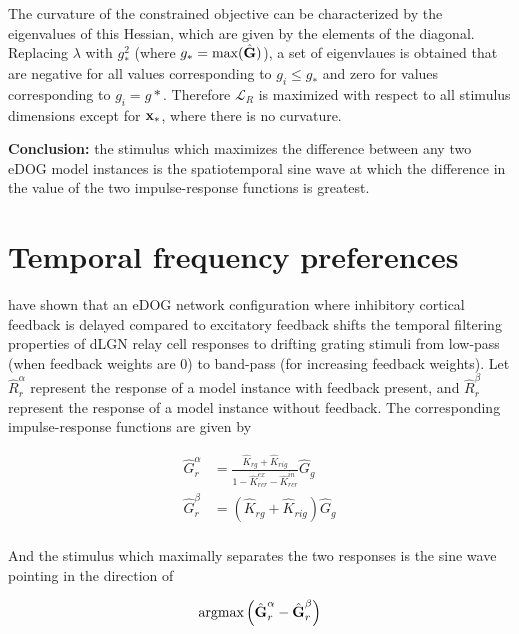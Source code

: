 \documentclass{article}
\newcommand{\Lagr}{\mathcal{L}}
\newcommand{\vect}[1]{\textbf{\textrm{#1}}}
\begin{document}
The curvature of the constrained objective can be characterized by the eigenvalues of this Hessian, which are given by the elements of the diagonal.
Replacing $\lambda$ with $g_*^2$ (where $g_* = \text{max}(\hat{\vect{G}})$), a set of eigenvlaues is obtained that are negative for all values corresponding to $g_i \leq g_*$ and zero for values corresponding to $g_i = g*$.
Therefore $\Lagr_R$ is maximized with respect to all stimulus dimensions except for $\vect{x}_*$, where there is no curvature.

\begin{center}
\begin{minipage}{0.8\textwidth}
	\textbf{Conclusion:} the stimulus which maximizes the difference between any two eDOG model instances is the spatiotemporal sine wave at which the difference in the value of the two impulse-response functions is greatest.
\end{minipage}
\end{center}


\section{Temporal frequency preferences}
\cite{mobarhan2018} have shown that an eDOG network configuration where inhibitory cortical feedback is delayed compared to excitatory feedback shifts the temporal filtering properties of dLGN relay cell responses to drifting grating stimuli from low-pass (when feedback weights are 0) to band-pass (for increasing feedback weights).  
Let $\hat{R}_r^\alpha$ represent the response of a model instance with feedback present, and $\hat{R}_r^\beta$ represent the response of a model instance without feedback.
The corresponding impulse-response functions are given by

\begin{align*}
	\hat{G}_r^\alpha & = \frac{\hat{K}_{rg} + \hat{K}_{rig}}
					   {1 - \hat{K}_{rcr}^{ex} - \hat{K}_{rcr}^{in}} \hat{G}_g \\
	\hat{G}_r^\beta & = \left( \hat{K}_{rg} + \hat{K}_{rig} \right) \hat{G}_g \\
\end{align*}

And the stimulus which maximally separates the two responses is the sine wave pointing in the direction of

\begin{equation*}
	\text{argmax}\left( \hat{\vect{G}}_r^\alpha - \hat{\vect{G}}_r^\beta \right)
\end{equation*}
\end{document}
